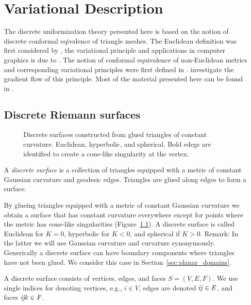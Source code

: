 \chapter{Variational Description}

The discrete uniformization theory persented here is based on the notion of discrete conformal eqivalence of triangle meshes. The Euclidean definition was first considered by \cite{Luo2004}, the variational principle and applications in computer graphics is due to \cite{Springborn2008, OWF2009, Bobenko2010}. The notion of conformal equivalence of non-Euclidean metrics and corresponding variational principles were first defined in \cite{Bobenko2010}. \cite{Guo2011} investigate the gradient flow of this principle.
Most of the material presented here can be found in \cite{BobSechSpr}.

\section{Discrete Riemann surfaces}

\begin{figure}
\centering
\scalebox{0.8}{}
\caption[Discrete surfaces from glued triangles]{Discrete surfaces constructed from glued triangles of constant curvature. Euclidean, hyperbolic, and spherical. Bold edegs are identified to create a cone-like singularity at the vertex.}
\label{fig:surface_triangles}
\end{figure}

\begin{definition}
A \emph{discrete surface} is a collection of triangles equipped with a metric of constant Gaussian curvature and geodesic edges. Triangles are glued along edges to form a surface.
\end{definition}

By glueing triangles equipped with a metric of constant Gaussian curvature we obtain a surface that has constant curvature everywhere except for points where the metric has cone-like singularities (Figure~\ref{fig:surface_triangles}). A discrete surface is called Euclidean for $K=0$, hyperbolic for $K<0$, and spherical if $K>0$.
Remark: In the latter we will use Gaussian curvature and curvature synonymously.
Generically a discrete surface can have boundary components where triangles have not been glued. We consider this case in Section~\ref{sec:planar_domains}. 

A discrete surface consists of vertices, edges, and faces $S=(V, E, F)$. We use single indices for denoting vertices, e.g., $i \in V$, edges are denoted $\it{ij}\in E$, and faces $\it{ijk}\in F$.

